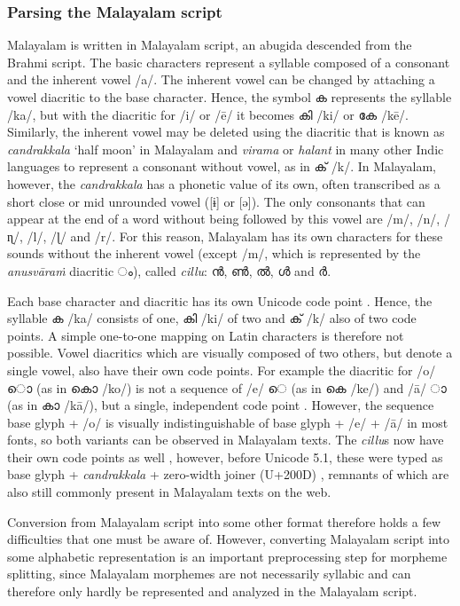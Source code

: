 \documentclass[a4paper]{article}
\newcommand{\ipa}[1]{{\cmuIPA{}#1}}
\begin{document}
\subsubsection{Parsing the Malayalam script}

Malayalam is written in Malayalam script, an abugida descended from the Brahmi script. The basic characters represent a syllable composed of a consonant and the inherent vowel /a/. The inherent vowel can be changed by attaching a vowel diacritic to the base character. Hence, the symbol ക represents the syllable /ka/, but with the diacritic for /i/ or /ē/ it becomes കി /ki/ or കേ /kē/. Similarly, the inherent vowel may be deleted using the diacritic that is known as \textit{candrakkala} `half moon' in Malayalam and \textit{virama} or \textit{halant} in many other Indic languages to represent a consonant without vowel, as in ക് /k/. In Malayalam, however, the \textit{candrakkala} has a phonetic value of its own, often transcribed as a short close or mid unrounded vowel ([\ipa{ɨ}] or [\ipa{ə}]). The only consonants that can appear at the end of a word without being followed by this vowel are /m/, /n/, /\ipa{ɳ}/, /l/, /\ipa{ɭ}/ and /r/. For this reason, Malayalam has its own characters for these sounds without the inherent vowel (except /m/, which is represented by the \textit{anusvāraṁ} diacritic ം), called \textit{cillu}: ൻ, ൺ, ൽ, ൾ and ർ.

Each base character and diacritic has its own Unicode code point \parencite[p.~334ff]{unicode5}. Hence, the syllable ക /ka/ consists of one, കി /ki/ of two and ക് /k/ also of two code points. A simple one-to-one mapping on Latin characters is therefore not possible. Vowel diacritics which are visually composed of two others, but denote a single vowel, also have their own code points. For example the diacritic for /o/ ൊ (as in കൊ /ko/) is not a sequence of /e/ െ (as in കെ /ke/) and /ā/ ാ (as in കാ /kā/), but a single, independent code point \parencite[p.~334f]{unicode5}. However, the sequence base glyph + /o/ is visually indistinguishable of base glyph + /e/ + /ā/ in most fonts, so both variants can be observed in Malayalam texts. The \textit{cillu}s now have their own code points as well \parencite{unicode51}, however, before Unicode 5.1, these were typed as base glyph + \textit{candrakkala} + zero-width joiner (U+200D) \parencite[p.~336f]{unicode5}, remnants of which are also still commonly present in Malayalam texts on the web.

Conversion from Malayalam script into some other format therefore holds a few difficulties that one must be aware of. However, converting Malayalam script into some alphabetic representation is an important preprocessing step for morpheme splitting, since Malayalam morphemes are not necessarily syllabic and can therefore only hardly be represented and analyzed in the Malayalam script.
\end{document}
